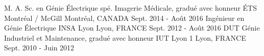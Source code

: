 

\begin{cventries}


\cventry
{M. A. Sc. en Génie Électrique spé. Imagerie Médicale, gradué avec honneur} %
{ÉTS Montréal / McGill} %
{Montréal, CANADA} %
{Sept. 2014 - Août 2016} %
{ %
}
\vspace{-1.5mm}
\cventry
{Ingénieur en Génie Électrique} %
{INSA Lyon} %
{Lyon, FRANCE} %
{Sept. 2012 - Août 2016} %
{ %
}
\vspace{-1mm}
\cventry
{DUT Génie Industriel et Maintenance, gradué avec honneur} %
{IUT Lyon 1} %
{Lyon, FRANCE} %
{Sept. 2010 - Juin 2012} %
{ %
}
\vspace{-5mm}
\end{cventries}